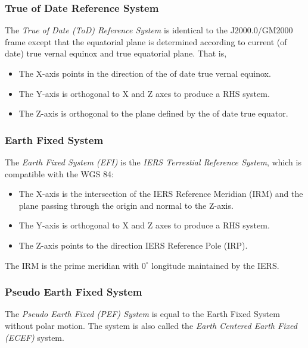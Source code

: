 \documentclass [12pt, a4paper] {article}
\begin{document}
\subsubsection{True of Date Reference System}
The \emph{True of Date (ToD) Reference System} is identical to the J2000.0/GM2000 frame except
that the equatorial plane is determined according to current (of date) true vernal equinox
and true equatorial plane. That is, 
\begin {itemize}
  \item The X-axis points in the direction of the of date true vernal equinox.
  \item The Y-axis is orthogonal to X and Z axes to produce a RHS system.
  \item The Z-axis is orthogonal to the plane defined by the of date true equator.
\end {itemize}

\subsubsection{Earth Fixed System}
The \emph{Earth Fixed System (EFI)} is the \emph{IERS Terrestial Reference System}, which is 
compatible with the WGS 84:
\begin {itemize}
  \item The X-axis is the intersection of the IERS Reference Meridian (IRM) 
  and the plane passing through the origin and normal to the Z-axis. 
  \item The Y-axis is orthogonal to X and Z axes to produce a RHS system.
  \item The Z-axis points to the direction IERS Reference Pole (IRP).
\end {itemize}
The IRM is the prime meridian with $0^\circ$ longitude maintained by the IERS. 

\subsubsection{Pseudo Earth Fixed System}
The \emph{Pseudo Earth Fixed (PEF) System} is equal to the Earth Fixed System without polar motion.
The system is also called the \emph{Earth Centered Earth Fixed (ECEF)} system.
\end{document}
